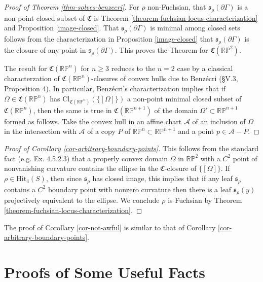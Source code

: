\documentclass[12pt,a4paper]{amsart}
\newcommand{\RP}{\mathbb R \mathbb P}
\theoremstyle{definition}
\theoremstyle{plain}
\numberwithin{equation}{section}
\begin{document}
\begin{proof}[Proof of Theorem \ref{thm-solves-benzecri}]
    For $\rho$ non-Fuchsian, that $\mathfrak{s}_\rho(\partial \Gamma)$ is a non-point closed subset of $\mathfrak{C}$ is Theorem \ref{theorem-fuchsian-locus-characterization} and Proposition \ref{image-closed}. That $\mathfrak{s}_\rho(\partial \Gamma)$ is minimal among closed sets follows from the characterization in Proposition \ref{image-closed} that $\mathfrak{s}_\rho(\partial \Gamma)$ is the closure of any point in $\mathfrak{s}_\rho(\partial \Gamma)$. This proves the Theorem for $\mathfrak{C}(\RP^2)$.

    The result for $\mathfrak{C}(\RP^n)$ for $n \geq 3$ reduces to the $n = 2$ case by a classical characterzation of $\mathfrak{C}(\RP^n)$-closures of convex hulls due to Benz\'ecri \cite{benzecri1960thesis} (\S V.3, Proposition 4). In particular, Benz\'ecri's characterization implies that if $\Omega \in \mathfrak{C}(\RP^n)$ has $\text{Cl}_{\mathfrak{C}(\RP^n)}(\{ [\Omega]\})$ a non-point minimal closed subset of $\mathfrak{C}(\RP^n)$, then the same is true in $\mathfrak{C}(\RP^{n+1})$ of the domain $\Omega' \subset \RP^{n+1}$ formed as follows. Take the convex hull in an affine chart $\mathcal{A}$ of an inclusion of $\Omega$ in the intersection with $\mathcal{A}$ of a copy $P$ of $\RP^n \subset \RP^{n+1}$ and a point $p \in \mathcal{A} - P$.
\end{proof}

\begin{proof}[Proof of Corollary \ref{cor-arbitrary-boundary-points}] This follows from the standard fact (e.g. \cite{goldman2022geometric} Ex. 4.5.2.3) that a properly convex domain $\Omega$ in $\RP^2$ with a $C^2$ point of nonvanishing curvature contains the ellipse in the $\mathfrak{C}$-closure of $\{[\Omega]\}$. If $\rho \in \text{Hit}_4(S)$, then since $\mathfrak{s}_\rho$ has closed image, this implies that if any leaf $\mathfrak{s}_\rho$ contains a $C^2$ boundary point with nonzero curvature then there is a leaf $\mathfrak{s}_\rho(y)$ projectively equivalent to the ellipse. We conclude $\rho$ is Fuchsian by Theorem \ref{theorem-fuchsian-locus-characterization}. \end{proof}

The proof of Corollary \ref{cor-not-awful} is similar to that of Corollary \ref{cor-arbitrary-boundary-points}.

\appendix
\section{Proofs of Some Useful Facts}
\end{document}

